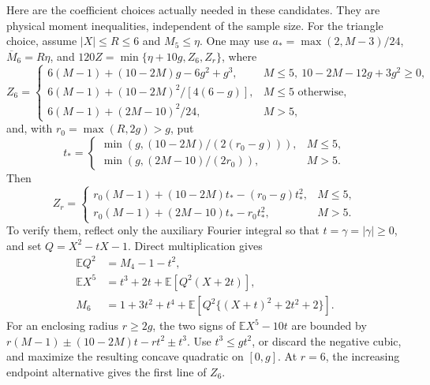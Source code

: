 \documentclass[aop,preprint]{imsart}
\theoremstyle{definition}
\newcommand{\E}{\mathbb E}
\numberwithin{equation}{section}
\begin{document}
Here are the coefficient choices actually needed in these candidates.
They are physical moment inequalities, independent of the sample size.
For the triangle choice, assume $|X|\le R\le6$ and $M_5\le\eta$.
One may use $a_* =\max(2,M-3)/24$, $\overline M_6=R\eta$, and
$120Z=\min\{\eta+10g,Z_6,Z_r\}$, where
\[
 Z_6=\begin{cases}
 6(M-1)+(10-2M)g-6g^2+g^3,
       &M\le5,\ 10-2M-12g+3g^2\ge0,\\
 6(M-1)+(10-2M)^2/[4(6-g)],&M\le5\text{ otherwise},\\
 6(M-1)+(2M-10)^2/24,&M>5,
 \end{cases}
\]
and, with $r_0=\max(R,2g)>g$, put
\[
 t_*=\begin{cases}
 \min(g,(10-2M)/(2(r_0-g))),&M\le5,\\
 \min(g,(2M-10)/(2r_0)),&M>5.
 \end{cases}
\]
Then
\[
 Z_r=\begin{cases}
 r_0(M-1)+(10-2M)t_*-(r_0-g)t_*^2,&M\le5,\\
 r_0(M-1)+(2M-10)t_*-r_0t_*^2,&M>5.
 \end{cases}
\]
To verify them, reflect only the auxiliary Fourier integral so that
$t=\gamma=|\gamma|\ge0$, and set $Q=X^2-tX-1$.
Direct multiplication gives
\begin{equation}\label{ut:pearson}
\begin{aligned}
 \E Q^2&=M_4-1-t^2,\\
 \E X^5&=t^3+2t+\E[Q^2(X+2t)],\\
 M_6&=1+3t^2+t^4+\E[Q^2\{(X+t)^2+2t^2+2\}].
\end{aligned}
\end{equation}
For an enclosing radius $r\ge2g$, the two signs of
$\E X^5-10t$ are bounded by
$r(M-1)\pm(10-2M)t-rt^2\pm t^3$.
Use $t^3\le gt^2$, or discard the negative cubic, and maximize the
resulting concave quadratic on $[0,g]$. At $r=6$, the increasing
endpoint alternative gives the first line of $Z_6$.
\end{document}
